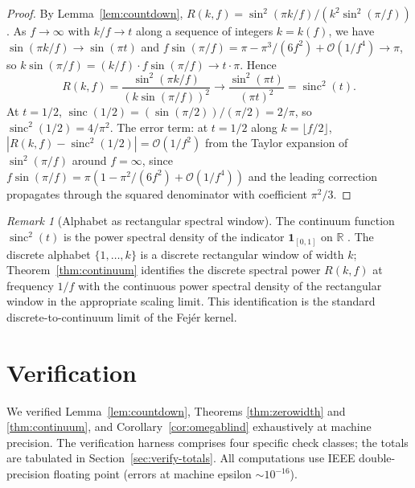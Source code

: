 \documentclass[11pt,reqno]{amsart}
\theoremstyle{plain}
\theoremstyle{definition}
\theoremstyle{remark}
\newtheorem{remark}[theorem]{Remark}
\DeclareMathOperator{\sinc}{sinc}
\newcommand{\R}{\mathbb{R}}
\newcommand{\bigO}{\mathcal{O}}
\begin{document}
\begin{proof}
By Lemma~\ref{lem:countdown},
$R(k, f) = \sin^2(\pi k / f) / (k^2 \sin^2(\pi / f))$. As
$f \to \infty$ with $k / f \to t$ along a sequence of integers
$k = k(f)$, we have $\sin(\pi k / f) \to \sin(\pi t)$ and
$f \sin(\pi / f) = \pi - \pi^3/(6 f^2) + \bigO(1/f^4) \to \pi$,
so $k \sin(\pi/f) = (k/f) \cdot f \sin(\pi/f) \to t \cdot \pi$.
Hence
\[
  R(k, f)
  = \frac{\sin^2(\pi k / f)}{(k \sin(\pi / f))^2}
  \longrightarrow \frac{\sin^2(\pi t)}{(\pi t)^2}
  = \sinc^2(t).
\]
At $t = 1/2$, $\sinc(1/2) = (\sin(\pi/2)) / (\pi/2) = 2/\pi$, so
$\sinc^2(1/2) = 4/\pi^2$. The error term: at $t = 1/2$ along
$k = \lfloor f / 2 \rfloor$, $|R(k, f) - \sinc^2(1/2)| =
\bigO(1/f^2)$ from the Taylor expansion of $\sin^2(\pi/f)$
around $f = \infty$, since
$f \sin(\pi/f) = \pi(1 - \pi^2/(6 f^2) + \bigO(1/f^4))$ and
the leading correction propagates through the squared
denominator with coefficient $\pi^2/3$.
\end{proof}

\begin{remark}[Alphabet as rectangular spectral window]
\label{rem:rectangular}
The continuum function $\sinc^2(t)$ is the power spectral density
of the indicator $\mathbf{1}_{[0, 1]}$ on $\R$ \cite{Shannon1949,
OppenheimSchafer2010}. The discrete alphabet $\{1, \ldots, k\}$
is a discrete rectangular window of width $k$;
Theorem~\ref{thm:continuum} identifies the discrete spectral
power $R(k, f)$ at frequency $1/f$ with the continuous power
spectral density of the rectangular window in the appropriate
scaling limit. This identification is the standard
discrete-to-continuum limit of the Fej\'er kernel.
\end{remark}

\section{Verification}
\label{sec:verification}

We verified Lemma~\ref{lem:countdown},
Theorems \ref{thm:zerowidth} and \ref{thm:continuum}, and
Corollary~\ref{cor:omegablind} exhaustively at machine precision.
The verification harness comprises four specific check classes;
the totals are tabulated in
Section~\ref{sec:verify-totals}. All computations use IEEE
double-precision floating point (errors at machine epsilon
$\sim 10^{-16}$).
\end{document}
